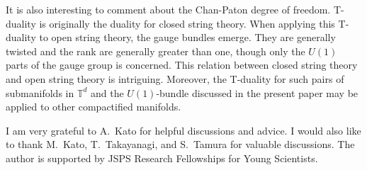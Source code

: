 \documentclass[a4paper,12pt]{article}
\newcommand{\T}{{\mathbb{T}}}
\begin{document}
It is also interesting to comment about the Chan-Paton degree of freedom. 
T-duality is originally the duality for closed string theory. 
When applying this T-duality to open string theory, the gauge bundles 
emerge. 
They are generally twisted and the rank are generally greater than one, 
though only the $U(1)$ parts of the gauge group is concerned. 
This relation between closed string theory and open string theory is 
intriguing. Moreover, 
the T-duality for such pairs of submanifolds in $\T^d$ 
and the $U(1)$-bundle discussed in the present paper 
may be applied to other compactified manifolds. 
 







\begin{center}
\end{center}

I am very grateful to A.~Kato for helpful discussions and advice.
I would also like to thank M.~Kato, T.~Takayanagi, and S.~Tamura 
for valuable discussions.
The author is  supported by JSPS Research Fellowships for Young
Scientists. 


\end{document}
